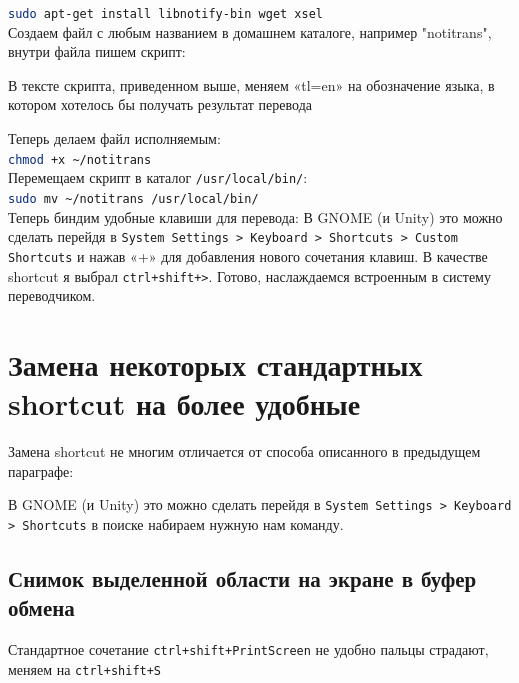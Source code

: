 \documentclass[a4paper, 12pt]{report}
\begin{document}
\lstinline[language=sh]{sudo apt-get install libnotify-bin wget xsel}\\

Создаем файл с любым названием в домашнем каталоге, например "notitrans", внутри файла пишем скрипт:



В тексте скрипта, приведенном выше, меняем «tl=en» на обозначение языка, в котором хотелось бы получать результат перевода

Теперь делаем файл исполняемым:\\
\lstinline[language=sh]{chmod +x ~/notitrans}\\

Перемещаем скрипт в каталог \lstinline|/usr/local/bin/|:\\
\lstinline[language=sh]{sudo mv ~/notitrans /usr/local/bin/}\\

Теперь биндим удобные клавиши для перевода:
В GNOME (и Unity) это можно сделать перейдя в \lstinline|System Settings > Keyboard > Shortcuts > Custom Shortcuts| и нажав «+» для добавления нового сочетания клавиш. В качестве shortcut я выбрал \lstinline|ctrl+shift+>|. Готово, наслаждаемся встроенным в систему переводчиком.

\section{Замена некоторых стандартных shortcut на более удобные}
Замена shortcut не многим отличается от способа описанного в предыдущем параграфе:

В GNOME (и Unity) это можно сделать перейдя в \lstinline|System Settings > Keyboard > Shortcuts| в поиске набираем нужную нам команду.

\subsection{Снимок выделенной области на экране в буфер обмена}
Стандартное сочетание \lstinline|ctrl+shift+PrintScreen| не удобно пальцы страдают, меняем на \lstinline|ctrl+shift+S| 
\end{document}
